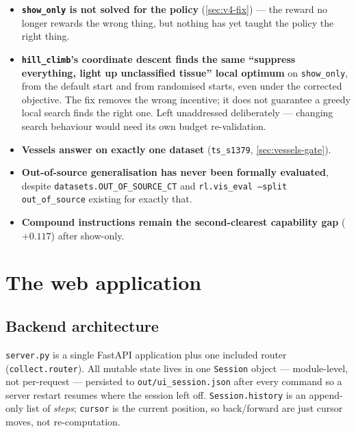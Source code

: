 \documentclass[10pt]{article}
\newcommand{\code}[1]{\texttt{#1}}
\begin{document}
\begin{itemize}[itemsep=2pt, topsep=2pt]
\item \textbf{\code{show\_only} is not solved for the policy}
  (\cref{sec:v4-fix}) --- the reward no longer rewards the wrong thing, but
  nothing has yet taught the policy the right thing.
\item \textbf{\code{hill\_climb}'s coordinate descent finds the same
  ``suppress everything, light up unclassified tissue'' local optimum} on
  \code{show\_only}, from the default start and from randomised starts, even
  under the corrected objective. The fix removes the wrong incentive; it
  does not guarantee a greedy local search finds the right one. Left
  unaddressed deliberately --- changing search behaviour would need its own
  budget re-validation.
\item \textbf{Vessels answer on exactly one dataset} (\code{ts\_s1379}, \cref{sec:vessels-gate}).
\item \textbf{Out-of-source generalisation has never been formally
  evaluated}, despite \code{datasets.OUT\_OF\_SOURCE\_CT} and \code{rl.vis\_eval
  --split out\_of\_source} existing for exactly that.
\item \textbf{Compound instructions remain the second-clearest capability
  gap} ($+0.117$) after show-only.
\end{itemize}

\newpage
\section{The web application}

\subsection{Backend architecture}

\code{server.py} is a single FastAPI application plus one included router
(\code{collect.router}). All mutable state lives in one \code{Session}
object --- module-level, not per-request --- persisted to
\code{out/ui\_session.json} after every command so a server restart resumes
where the session left off. \code{Session.history} is an append-only list of
\emph{steps}; \code{cursor} is the current position, so back/forward are
just cursor moves, not re-computation.
\end{document}
